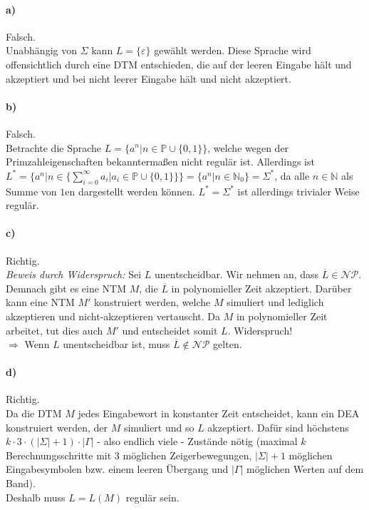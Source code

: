 \paragraph{a)}
	Falsch.\\
	Unabhängig von $\Sigma$ kann $L=\{\varepsilon \}$ gewählt werden. Diese Sprache wird offensichtlich durch eine DTM entschieden, die auf der leeren Eingabe hält und akzeptiert und bei nicht leerer Eingabe hält und nicht akzeptiert.
	
	\paragraph{b)}
	Falsch.\\
	Betrachte die Sprache $L=\{a^n \vert n\in \mathbb{P}\cup \{0,1\}\}$, welche wegen der Primzahleigenschaften bekanntermaßen nicht regulär ist. Allerdings ist $L^*=\{a^n \vert n\in \{\sum_{i = 0}^{\infty} a_i \vert a_i \in \mathbb{P}\cup \{0,1\}\}\}=\{a^n \vert n\in \mathbb{N}_0\}=\Sigma^*$, da alle $n \in \mathbb{N}$ als Summe von $1$en dargestellt werden können. $L^*=\Sigma^*$ ist allerdings trivialer Weise regulär.
	
	\paragraph{c)}
	Richtig.\\
	\textit{Beweis durch Widerspruch:} Sei $L$ unentscheidbar. Wir nehmen an, dass $\overline{L} \in \mathcal{NP}$. Demnach gibt es eine NTM $M$, die $\overline{L}$ in polynomieller Zeit akzeptiert. %
	Darüber kann eine NTM $M'$ konstruiert werden, welche $M$ simuliert und lediglich akzeptieren und nicht-akzeptieren vertauscht. Da $M$ in polynomieller Zeit arbeitet, tut dies auch $M'$ und entscheidet somit $L$. Widerspruch!\\
	$\Rightarrow$ Wenn $L$ unentscheidbar ist, muss $\overline{L} \notin \mathcal{NP}$ gelten.

	\paragraph{d)}
	Richtig.\\
	Da die DTM $M$ jedes Eingabewort in konstanter Zeit entscheidet, kann ein DEA konstruiert werden, der $M$ simuliert und so $L$ akzeptiert. Dafür sind höchstens $k\cdot 3\cdot(|\Sigma|+1)\cdot |\Gamma|$ - also endlich viele - Zustände nötig (maximal $k$ Berechnungsschritte mit $3$ möglichen Zeigerbewegungen, $|\Sigma|+1$ möglichen Eingabesymbolen bzw. einem leeren Übergang und $|\Gamma|$ möglichen Werten auf dem Band).\\
	Deshalb muss $L=L(M)$ regulär sein.
